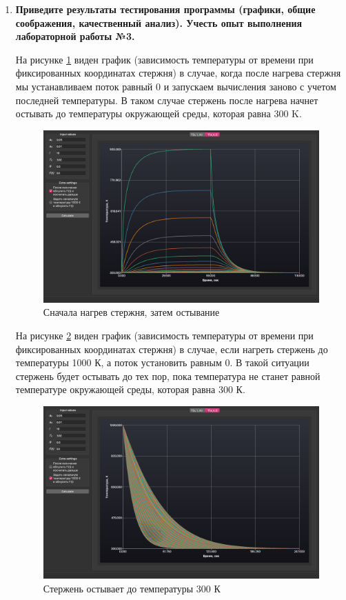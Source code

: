 \begin{enumerate}
    \item \textbf{Приведите результаты тестирования программы (графики, общие соображения, качественный анализ). Учесть опыт выполнения лабораторной работы №3.}

        На рисунке \ref{img:again} виден график (зависимость температуры от времени при фиксированных координатах стержня) в случае, когда после нагрева стержня мы устанавливаем поток равный 0 и запускаем вычисления заново с учетом последней температуры. В таком случае стержень после нагрева начнет остывать до температуры окружающей среды, которая равна 300 K.

        \begin{figure}[H]
            \centering
            \includegraphics[scale=0.35]{img/again.png}
            \caption{Сначала нагрев стержня, затем остывание}
            \label{img:again}
        \end{figure}

        На рисунке \ref{img:start_temp} виден график (зависимость температуры от времени при фиксированных координатах стержня) в случае, если нагреть стержень до температуры 1000 К, а поток установить равным 0. В такой ситуации стержень будет остывать до тех пор, пока температура не станет равной температуре окружающей среды, которая равна 300 К.

        \begin{figure}[H]
            \centering
            \includegraphics[scale=0.35]{img/start_temp.png}
            \caption{Стержень остывает до температуры 300 К}
            \label{img:start_temp}
        \end{figure}


\end{enumerate}
